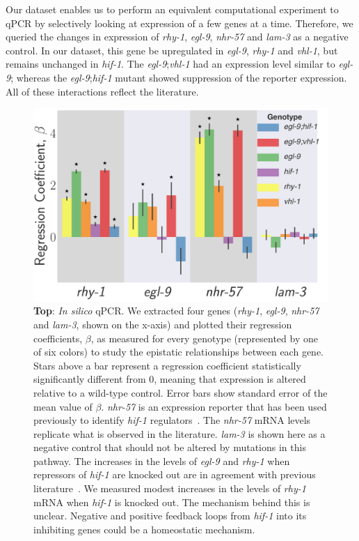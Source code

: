 \documentclass[9pt,twocolumn,twoside]{pnas-new}
\newcommand{\egl}{\emph{egl-9}}
\newcommand{\rhy}{\emph{rhy-1}}
\newcommand{\vhl}{\emph{vhl-1}}
\newcommand{\hif}{\emph{hif-1}}
\newcommand{\nhr}{\emph{nhr-57}}
\newcommand{\lam}{\emph{lam-3}}
\begin{document}
Our dataset enables us to perform an equivalent computational experiment to qPCR
by selectively looking at expression of a few genes at a time. Therefore, we
queried the changes in expression of \rhy{}, \egl{}, \nhr{} and \lam{} as a negative
control. In our dataset, this gene be upregulated in \egl{}, \rhy{} and
\vhl{}, but remains unchanged in \hif{}.
The \egl{};\vhl{} had an expression level similar to \egl{}; whereas the
\egl{};\hif{} mutant showed suppression of the reporter expression. All of these
interactions reflect the literature.

\begin{figure}[tbhp]
\centering
\includegraphics[width=\linewidth]{figs/qpcr.pdf}
\caption{
\textbf{Top}: \emph{In silico} qPCR. We extracted
four genes (\rhy{}, \egl{}, \nhr{} and \lam{}, shown on the x-axis) and plotted
their regression coefficients, $\beta$, as measured for every genotype (represented by
one of six colors) to study the epistatic relationships between each gene.
Stars above a bar represent a regression coefficient statistically significantly
different from 0, meaning that expression is altered relative to a
wild-type control. Error bars show standard error of the mean value of $\beta$.
\nhr{} is an expression
reporter that has been used previously to identify \hif{}
regulators~\cite{Shen2006,Shao2009}. The \nhr{} mRNA levels replicate what is
observed in the literature. \lam{} is shown here as a negative control that
should not be altered by mutations in this pathway. The increases in the levels
of \egl{} and \rhy{} when repressors of \hif{} are knocked out are in agreement
with previous literature~\cite{Powell-Coffman2010}. We measured modest increases
in the levels of \rhy{} mRNA when \hif{} is knocked out. The mechanism behind
this is unclear. Negative and positive feedback loops from \hif{} into its
inhibiting genes could be a homeostatic mechanism.
}
\label{fig:qpcr}
\end{figure}
\end{document}
